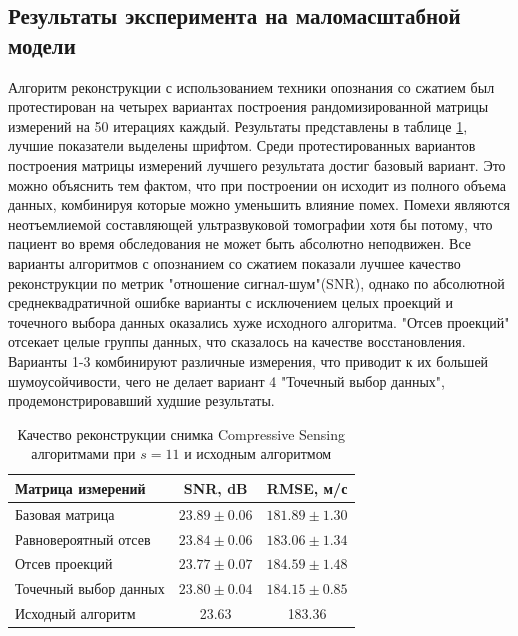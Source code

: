 \documentclass[14pt]{matmex-diploma}
\begin{document}
\subsection{Результаты эксперимента на маломасштабной модели}
Алгоритм реконструкции с использованием техники опознания со сжатием был протестирован на четырех вариантах построения рандомизированной матрицы измерений на 50 итерациях каждый. Результаты представлены в таблице \ref{table:fin_results}, лучшие показатели выделены шрифтом. Среди протестированных вариантов построения матрицы измерений лучшего результата достиг базовый вариант. Это можно объяснить тем фактом, что при построении он исходит из полного объема данных, комбинируя которые можно уменьшить влияние помех. Помехи являются неотъемлиемой составляющей ультразвуковой томографии хотя бы потому, что пациент во время обследования не может быть абсолютно неподвижен. Все варианты алгоритмов с опознанием со сжатием показали лучшее качество реконструкции по метрик "отношение сигнал-шум"(SNR), однако по абсолютной среднеквадратичной ошибке варианты с исключением целых проекций и точечного выбора данных оказались хуже исходного алгоритма. "Отсев проекций" отсекает целые группы данных, что сказалось на качестве восстановления. Варианты 1-3 комбинируют различные измерения, что приводит к их большей шумоусойчивости, чего не делает вариант 4 "Точечный выбор данных", продемонстрировавший худшие результаты. 
\begin{table}
\centering
\begin{tabular}{| l | c | c | }
    \hline
    Матрица измерений & SNR, dB & RMSE, м/с \\
    \hline
    Базовая матрица & $\mathbf{23.89 \pm 0.06}$ & $\mathbf{181.89 \pm 1.30}$ \\
    Равновероятный отсев & $23.84 \pm 0.06$ & $183.06 \pm 1.34$ \\
    Отсев проекций & $23.77 \pm 0.07$ & $184.59 \pm 1.48$ \\
    Точечный выбор данных & $23.80 \pm 0.04$ & $184.15 \pm 0.85$ \\
    \hline
    Исходный алгоритм & 23.63 & 183.36 \\
    \hline
\end{tabular}
\caption{Качество реконструкции снимка Compressive Sensing алгоритмами при $s = 11$  и исходным алгоритмом}
\label{table:fin_results}
\end{table}
\end{document}
